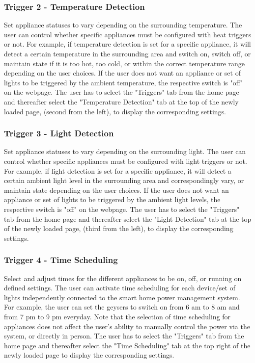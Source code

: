 \documentclass[11pt, a4paper]{article}
\newcounter{subsubsubsection}[subsubsection]
\begin{document}
	\subsubsection{Trigger 2 - Temperature Detection}
	Set appliance statuses to vary depending on the surrounding temperature.
	The user can control whether specific appliances must be configured with heat triggers or not. For example, if temperature detection is set for a specific appliance, it will detect a certain temperature in the surrounding area and switch on, switch off, or maintain state if it is too hot, too cold, or within the correct temperature range depending on the user choices. If the user does not want an appliance or set of lights to be triggered by the ambient temperature, the respective switch is "off" on the webpage. 
	The user has to select the "Triggers" tab from the home page and thereafter select the "Temperature Detection" tab at the top of the newly loaded page, (second from the left), to display the corresponding settings.
	\subsubsection{Trigger 3 - Light Detection}
	Set appliance statuses to vary depending on the surrounding light.
	The user can control whether specific appliances must be configured with light triggers or not. For example, if light detection is set for a specific appliance, it will detect a certain ambient light level in the surrounding area and correspondingly vary, or maintain state depending on the user choices. If the user does not want an appliance or set of lights to be triggered by the ambient light levels, the respective switch is "off" on the webpage. 
	The user has to select the "Triggers" tab from the home page and thereafter select the "Light Detection" tab at the top of the newly loaded page, (third from the left), to display the corresponding settings.
	\subsubsection{Trigger 4 - Time Scheduling}
	Select and adjust times for the different appliances to be on, off, or running on defined settings. 
	The user can activate time scheduling for each device/set of lights independently connected to the smart home power management system. For example, the user can set the geysers to switch on from 6 am to 8 am and from 7 pm to 9 pm everyday. Note that the selection of time scheduling for appliances does not affect the user's ability to manually control the power via the system, or directly in person. 
	The user has to select the "Triggers" tab from the home page and thereafter select the "Time Scheduling" tab at the top right of the newly loaded page to display the corresponding settings.
\end{document}
